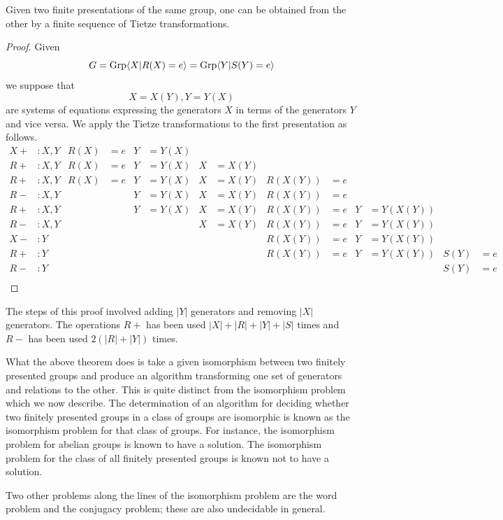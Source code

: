 \begin{thm} Given two finite presentations of the same group, one can be
    obtained from the other by a finite sequence of Tietze transformations.
\end{thm}
\begin{proof} Given \[G = \mathrm{Grp}\langle X|R(X) = e\rangle = \mathrm{Grp}\langle Y|S(Y) = e\rangle \] we suppose
    that \[X = X(Y), Y = Y(X)\] are systems of equations expressing the
    generators $X$ in terms of the generators $Y$ and vice versa. We apply the
    Tietze transformations to the first presentation as follows.
    {\small
\begin{align*}
X+ & : X,Y & R(X) & = e & Y & = Y(X) &   &        &         &     &   &           &      &    \\
R+ & : X,Y & R(X) & = e & Y & = Y(X) & X & = X(Y) &         &     &   &           &      &    \\
R+ & : X,Y & R(X) & = e & Y & = Y(X) & X & = X(Y) & R(X(Y)) & = e &   &           &      &    \\
R- & : X,Y &      &     & Y & = Y(X) & X & = X(Y) & R(X(Y)) & = e &   &           &      &    \\
R+ & : X,Y &      &     & Y & = Y(X) & X & = X(Y) & R(X(Y)) & = e & Y & = Y(X(Y)) &      &    \\
R- & : X,Y &      &     &   &        & X & = X(Y) & R(X(Y)) & = e & Y & = Y(X(Y)) &      &    \\
X- & :   Y &      &     &   &        &   &        & R(X(Y)) & = e & Y & = Y(X(Y)) &      &    \\
R+ & :   Y &      &     &   &        &   &        & R(X(Y)) & = e & Y & = Y(X(Y)) & S(Y) & = e\\
R- & :   Y &      &     &   &        &   &        &         &     &   &           & S(Y) & = e\\
\end{align*}
}
\end{proof}

\begin{rem} The steps of this proof involved adding $|Y|$ generators and
    removing $|X|$ generators. The operations $R+$ has been used
    \(|X|+|R|+|Y|+|S|\) times and $R-$ has been used \(2(|R|+|Y|)\) times.
\end{rem}

\begin{ap} What the above theorem does is take a given isomorphism between two
    finitely presented groups and produce an algorithm transforming one set of
    generators and relations to the other. This is quite distinct from the
    isomorphism problem which we now describe. The determination of an
    algorithm for deciding whether two finitely presented groups in a class of
    groups are isomorphic is known as the isomorphism problem for that class of
    groups. For instance, the isomorphism problem for abelian groups is known
    to have a solution. The isomorphism problem for the class of all finitely
    presented groups is known not to have a solution.

    Two other problems along the lines of the isomorphism problem are the word
    problem and the conjugacy problem; these are also undecidable in general.
\end{ap}

